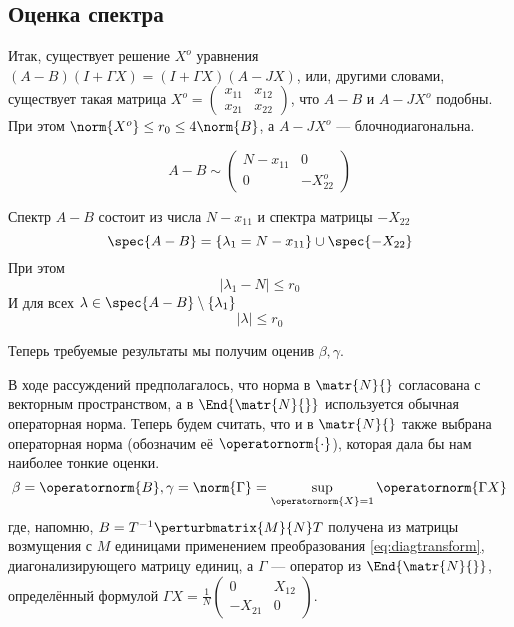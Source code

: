 \subsection{Оценка спектра}
Итак, существует решение \( X^o \) уравнения
\( (A-B)(I+\Gamma X) = (I+\Gamma X)(A-JX) \),
или, другими словами, существует такая матрица
\( X^o =
\begin{pmatrix}
    x_{11} & x_{12} \\
    x_{21} & x_{22}
\end{pmatrix}
\),
что \( A-B \) и \( A - JX^o \) подобны.
При этом \( \norm{X^o} \leq r_0 \leq 4\norm{B} \),
а \( A - JX^o \) --- блочнодиагональна.

\[
    A-B \sim
    \begin{pmatrix}
        N - x_{11} & 0 \\
        0          & -X_{22}^o
    \end{pmatrix}
    \]

\begin{lemma}
    Спектр \( A - B \) состоит из числа \( N - x_{11} \)
    и спектра матрицы \( -X_{22} \)
    \[ \spec{A-B} = \{ \lambda_1 = N - x_{11} \} \cup \spec{-X_{22}} \]
    При этом
    \[ \lvert \lambda_1 - N \rvert \leq r_0 \]
    И для всех \( \lambda\in\spec{A-B}\setminus\{\lambda_1\} \)
    \[ \lvert\lambda\rvert \leq r_0 \]
\end{lemma}

Теперь требуемые результаты мы получим оценив \( \beta, \gamma \).

В ходе рассуждений предполагалось, что норма в \( \matr{N}{} \)
согласована с векторным пространством,
а в \( \End{\matr{N}{}} \) используется обычная операторная норма.
Теперь будем считать, что и в \( \matr{N}{} \)
также выбрана операторная норма  (обозначим её \( \operatornorm{\cdot} \)),
которая дала бы нам наиболее тонкие оценки.
\[ \beta = \operatornorm{B}, \gamma = \norm{\Gamma} = \sup_{\operatornorm{X}=1} \operatornorm{\Gamma X} \]
где, напомню, \( B = T^{-1} \perturbmatrix{M}{N} T \)
получена из матрицы возмущения с \( M \) единицами применением преобразования \eqref{eq:diagtransform},
диагонализирующего матрицу единиц,
а \( \Gamma \) --- оператор из \( \End{\matr{N}{}} \),
определённый формулой
\( \Gamma X = \frac1N \begin{pmatrix}0 & X_{12} \\ -X_{21} & 0\end{pmatrix} \).

